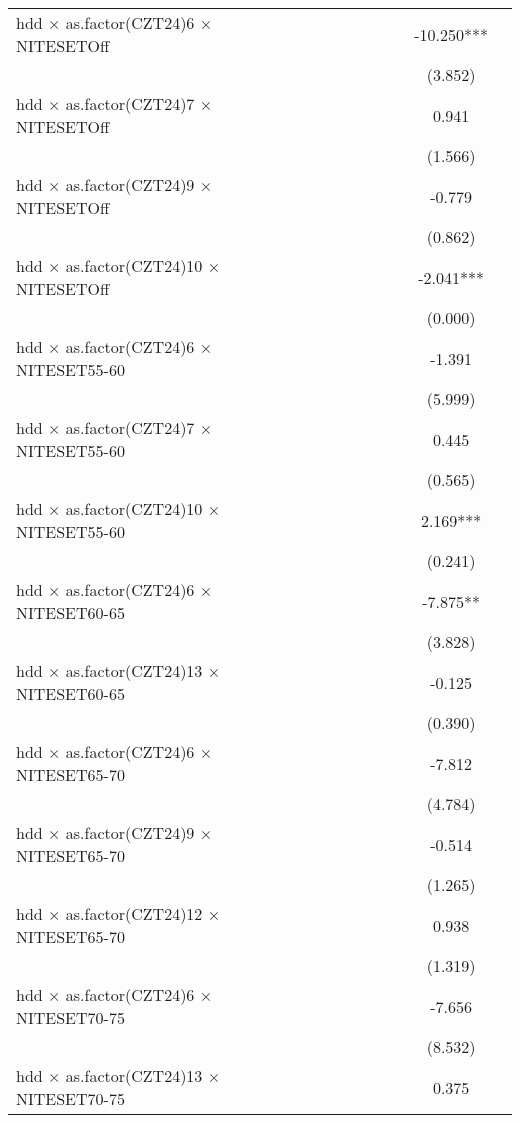\documentclass[
]{article}
\begin{document}
\begin{table}
{\begin{tabular}[t]{lcccccccccc}
hdd × as.factor(CZT24)6 × NITESETOff &  &  &  &  &  &  &  &  & -10.250*** & \\
 &  &  &  &  &  &  &  &  & (3.852) & \\
hdd × as.factor(CZT24)7 × NITESETOff &  &  &  &  &  &  &  &  & 0.941 & \\
 &  &  &  &  &  &  &  &  & (1.566) & \\
hdd × as.factor(CZT24)9 × NITESETOff &  &  &  &  &  &  &  &  & -0.779 & \\
 &  &  &  &  &  &  &  &  & (0.862) & \\
hdd × as.factor(CZT24)10 × NITESETOff &  &  &  &  &  &  &  &  & -2.041*** & \\
 &  &  &  &  &  &  &  &  & (0.000) & \\
hdd × as.factor(CZT24)6 × NITESET55-60 &  &  &  &  &  &  &  &  & -1.391 & \\
 &  &  &  &  &  &  &  &  & (5.999) & \\
hdd × as.factor(CZT24)7 × NITESET55-60 &  &  &  &  &  &  &  &  & 0.445 & \\
 &  &  &  &  &  &  &  &  & (0.565) & \\
hdd × as.factor(CZT24)10 × NITESET55-60 &  &  &  &  &  &  &  &  & 2.169*** & \\
 &  &  &  &  &  &  &  &  & (0.241) & \\
hdd × as.factor(CZT24)6 × NITESET60-65 &  &  &  &  &  &  &  &  & -7.875** & \\
 &  &  &  &  &  &  &  &  & (3.828) & \\
hdd × as.factor(CZT24)13 × NITESET60-65 &  &  &  &  &  &  &  &  & -0.125 & \\
 &  &  &  &  &  &  &  &  & (0.390) & \\
hdd × as.factor(CZT24)6 × NITESET65-70 &  &  &  &  &  &  &  &  & -7.812 & \\
 &  &  &  &  &  &  &  &  & (4.784) & \\
hdd × as.factor(CZT24)9 × NITESET65-70 &  &  &  &  &  &  &  &  & -0.514 & \\
 &  &  &  &  &  &  &  &  & (1.265) & \\
hdd × as.factor(CZT24)12 × NITESET65-70 &  &  &  &  &  &  &  &  & 0.938 & \\
 &  &  &  &  &  &  &  &  & (1.319) & \\
hdd × as.factor(CZT24)6 × NITESET70-75 &  &  &  &  &  &  &  &  & -7.656 & \\
 &  &  &  &  &  &  &  &  & (8.532) & \\
hdd × as.factor(CZT24)13 × NITESET70-75 &  &  &  &  &  &  &  &  & 0.375 & \\

\end{tabular}}
\end{table}
\end{document}

